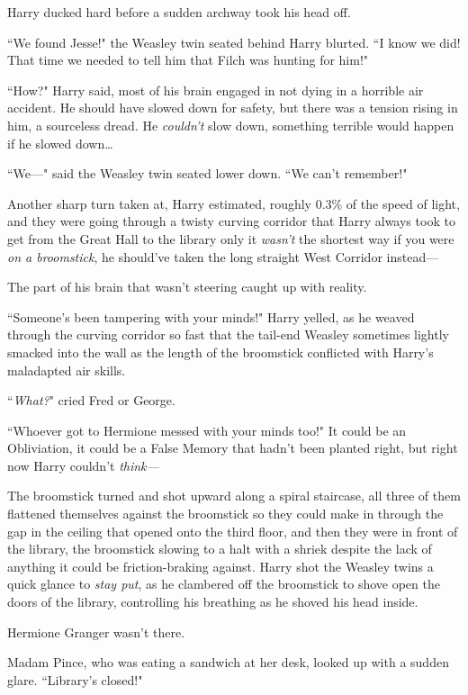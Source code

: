 Harry ducked hard before a sudden archway took his head off.

``We found Jesse!" the Weasley twin seated behind Harry blurted. ``I know we did! That time we needed to tell him that Filch was hunting for him!"

``How?" Harry said, most of his brain engaged in not dying in a horrible air accident. He should have slowed down for safety, but there was a tension rising in him, a sourceless dread. He \emph{couldn't} slow down, something terrible would happen if he slowed down{\ldots}

``We—" said the Weasley twin seated lower down. ``We can't remember!"

Another sharp turn taken at, Harry estimated, roughly 0.3\% of the speed of light, and they were going through a twisty curving corridor that Harry always took to get from the Great Hall to the library only it \emph{wasn't} the shortest way if you were \emph{on a broomstick}, he should've taken the long straight West Corridor instead—

The part of his brain that wasn't steering caught up with reality.

``Someone's been tampering with your minds!" Harry yelled, as he weaved through the curving corridor so fast that the tail-end Weasley sometimes lightly smacked into the wall as the length of the broomstick conflicted with Harry's maladapted air skills.

``\emph{What?}" cried Fred or George.

``Whoever got to Hermione messed with your minds too!" It could be an Obliviation, it could be a False Memory that hadn't been planted right, but right now Harry couldn't \emph{think—}

The broomstick turned and shot upward along a spiral staircase, all three of them flattened themselves against the broomstick so they could make in through the gap in the ceiling that opened onto the third floor, and then they were in front of the library, the broomstick slowing to a halt with a shriek despite the lack of anything it could be friction-braking against. Harry shot the Weasley twins a quick glance to \emph{stay put}, as he clambered off the broomstick to shove open the doors of the library, controlling his breathing as he shoved his head inside.

Hermione Granger wasn't there.

Madam Pince, who was eating a sandwich at her desk, looked up with a sudden glare. ``Library's closed!"

